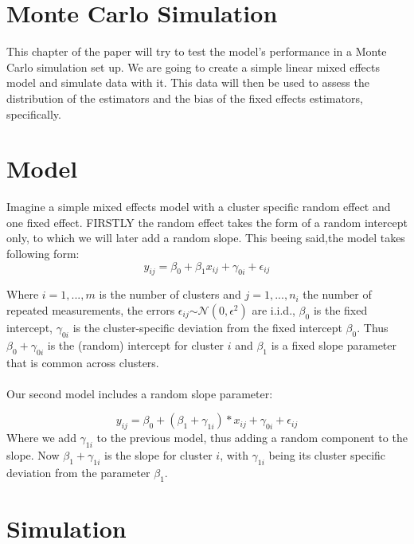 \documentclass[a4paper,11pt]{article}
\begin{document}
\section{Monte Carlo Simulation}

 	This chapter of the paper will try to test the model's performance in a Monte Carlo simulation set up. We are going to create a simple linear mixed effects model and simulate data with it. This data will then be used to assess the distribution of the estimators and the bias of the fixed effects estimators, specifically.    
 	
 	\section{Model}
 	Imagine a simple mixed effects model with a cluster specific random effect and one fixed effect. FIRSTLY the random effect takes the form of a random intercept only, to which we will later add a random slope. This beeing said,the model takes following form:
 		\begin{equation}\label{eq:model1}
 	y_{ij}=\beta_0+\beta_1x_{ij}+\gamma_{0i}+\epsilon_{ij}
 	\end{equation}
  		
 	Where $i=1,...,m$ is the number of clusters and $j=1,...,n_i$ the number of repeated measurements, the errors $\epsilon_{ij}$$\sim\mathcal{N}(0,\epsilon^2)$ are i.i.d., $\beta_0$ is the fixed intercept, $\gamma_{0i}$ is the cluster-specific deviation from the fixed intercept $\beta_0$.
 	Thus $\beta_0+\gamma_{0i}$ is the (random) intercept for cluster $i$ and $\beta_1$ is a fixed slope parameter that is common across clusters.
 	\\
 	\\
 	Our second model includes a random slope parameter:
 	 	
 		\begin{equation}\label{eq:model2}
 	y_{ij}=\beta_0+(\beta_1+\gamma_{1i})*x_{ij}+\gamma_{0i}+\epsilon_{ij}
 	\end{equation}
 	Where we add $\gamma_{1i}$ to the previous model, thus adding a random component to the slope. Now $\beta_1+\gamma_{1i}$ is the slope for cluster $i$, with $\gamma_{1i}$ being its cluster specific deviation from the parameter $\beta_1$. 
 	
 
 	
	\section{Simulation}
\end{document}
